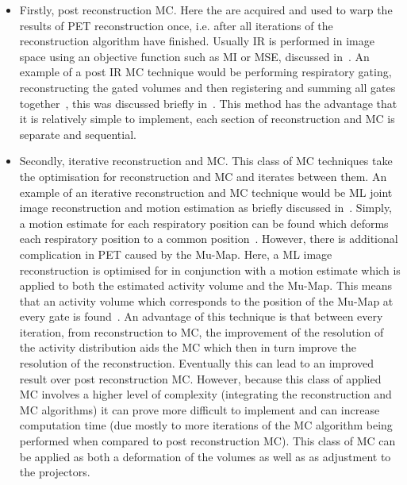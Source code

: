             \begin{itemize}
                \item Firstly, post reconstruction \gls{MC}. Here the  are acquired and used to warp the results of \gls{PET} reconstruction once, i.e. after all iterations of the reconstruction algorithm have finished. Usually \gls{IR} is performed in image space using an objective function such as \gls{MI} or \gls{MSE}, discussed in~. An example of a post \gls{IR} \gls{MC} technique would be performing respiratory gating, reconstructing the gated volumes and then registering and summing all gates together~\parencite{Polycarpou2012AnalysisImaging}, this was discussed briefly in~. This method has the advantage that it is relatively simple to implement, each section of reconstruction and \gls{MC} is separate and sequential.
                
                \item Secondly, iterative reconstruction and \gls{MC}. This class of \gls{MC} techniques take the optimisation for reconstruction and \gls{MC} and iterates between them. An example of an iterative reconstruction and \gls{MC} technique would be \gls{ML} joint image reconstruction and motion estimation as briefly discussed in~. Simply, a motion estimate for each respiratory position can be found which deforms each respiratory position to a common position~\parencite{Manjeshwar2006, Qiao2006}. However, there is additional complication in \gls{PET} caused by the \gls{Mu-Map}. Here, a \gls{ML} image reconstruction is optimised for in conjunction with a motion estimate which is applied to both the estimated activity volume and the \gls{Mu-Map}. This means that an activity volume which corresponds to the position of the \gls{Mu-Map} at every gate is found~\parencite{Bousse2016a, Bousse2016}. An advantage of this technique is that between every iteration, from reconstruction to \gls{MC}, the improvement of the resolution of the activity distribution aids the \gls{MC} which then in turn improve the resolution of the reconstruction. Eventually this can lead to an improved result over post reconstruction \gls{MC}. However, because this class of applied \gls{MC} involves a higher level of complexity (integrating the reconstruction and \gls{MC} algorithms) it can prove more difficult to implement and can increase computation time (due mostly to more iterations of the \gls{MC} algorithm being performed when compared to post reconstruction \gls{MC}). This class of \gls{MC} can be applied as both a deformation of the volumes as well as as adjustment to the projectors.
                

\end{itemize}
